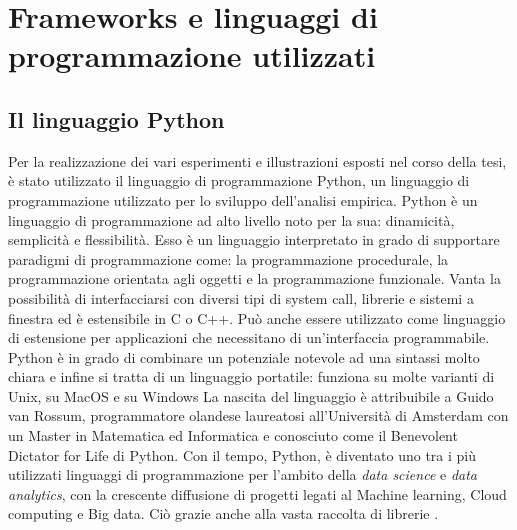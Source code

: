 
\chapter{Frameworks e linguaggi di programmazione utilizzati}

\section{Il linguaggio Python}

\begin{figure}  %
    \setlength{\fboxsep}{1pt} %
    \setlength{\fboxrule}{0pt} %
\end{figure}

Per la realizzazione dei vari esperimenti e illustrazioni esposti nel corso della
tesi, è stato utilizzato il linguaggio di programmazione Python, un linguaggio di 
programmazione utilizzato per lo sviluppo dell’analisi empirica. 
Python è un linguaggio di programmazione ad alto livello noto per la 
sua: dinamicità, semplicità e flessibilità.
Esso è un linguaggio interpretato in grado di supportare paradigmi di 
programmazione come: la programmazione procedurale, la programmazione orientata agli 
oggetti e la programmazione funzionale.
Vanta la possibilità di interfacciarsi con diversi tipi di system call, librerie e 
sistemi a finestra ed è estensibile in C o C++. Può anche essere utilizzato come linguaggio di 
estensione per applicazioni che necessitano di un’interfaccia programmabile. Python è in 
grado di combinare un potenziale notevole ad una sintassi molto chiara e infine si tratta di 
un linguaggio portatile: funziona su molte varianti di Unix, su MacOS e su Windows 
La nascita del linguaggio è attribuibile a Guido van Rossum, programmatore 
olandese laureatosi all’Università di Amsterdam con un Master in Matematica ed 
Informatica e conosciuto come il Benevolent Dictator for Life di Python. 
Con il tempo, Python, è diventato uno tra i più utilizzati
linguaggi di programmazione per l'ambito della \textit{data science} e 
\textit{data analytics}, con la crescente diffusione di progetti legati al 
Machine learning, Cloud computing e Big data. Ciò grazie anche
alla vasta raccolta di librerie \cite{Python_Wikipedia}.

